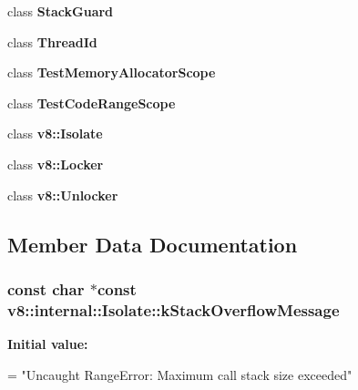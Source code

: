 \begin{DoxyCompactItemize}
\item 
\hypertarget{classv8_1_1internal_1_1_isolate_a006f03b7efe2d351d5832ca878e89506}{}class {\bfseries Stack\+Guard}\label{classv8_1_1internal_1_1_isolate_a006f03b7efe2d351d5832ca878e89506}

\item 
\hypertarget{classv8_1_1internal_1_1_isolate_a3d7f08d995559e3358af66ef439e3490}{}class {\bfseries Thread\+Id}\label{classv8_1_1internal_1_1_isolate_a3d7f08d995559e3358af66ef439e3490}

\item 
\hypertarget{classv8_1_1internal_1_1_isolate_aec8272868361afdd8e9cd777f30198f9}{}class {\bfseries Test\+Memory\+Allocator\+Scope}\label{classv8_1_1internal_1_1_isolate_aec8272868361afdd8e9cd777f30198f9}

\item 
\hypertarget{classv8_1_1internal_1_1_isolate_ad80dbbca5b659bae6d1837b48e6df17f}{}class {\bfseries Test\+Code\+Range\+Scope}\label{classv8_1_1internal_1_1_isolate_ad80dbbca5b659bae6d1837b48e6df17f}

\item 
\hypertarget{classv8_1_1internal_1_1_isolate_aa4398493fc805d9e746396ecf8002375}{}class {\bfseries v8\+::\+Isolate}\label{classv8_1_1internal_1_1_isolate_aa4398493fc805d9e746396ecf8002375}

\item 
\hypertarget{classv8_1_1internal_1_1_isolate_a2a2550edf3d001d59bea4473ca370426}{}class {\bfseries v8\+::\+Locker}\label{classv8_1_1internal_1_1_isolate_a2a2550edf3d001d59bea4473ca370426}

\item 
\hypertarget{classv8_1_1internal_1_1_isolate_a9944a29aae4e98edfd36fdb0aa831ef0}{}class {\bfseries v8\+::\+Unlocker}\label{classv8_1_1internal_1_1_isolate_a9944a29aae4e98edfd36fdb0aa831ef0}

\end{DoxyCompactItemize}


\subsection{Member Data Documentation}
\hypertarget{classv8_1_1internal_1_1_isolate_a313c6fd713fcc52007667fd9fe2bf065}{}
\subsubsection[{k\+Stack\+Overflow\+Message}]{\setlength{\rightskip}{0pt plus 5cm}const char $\ast$const v8\+::internal\+::\+Isolate\+::k\+Stack\+Overflow\+Message\hspace{0.3cm}{\ttfamily [static]}}\label{classv8_1_1internal_1_1_isolate_a313c6fd713fcc52007667fd9fe2bf065}
{\bfseries Initial value\+:}
\begin{DoxyCode}
=
  \textcolor{stringliteral}{"Uncaught RangeError: Maximum call stack size exceeded"}
\end{DoxyCode}


